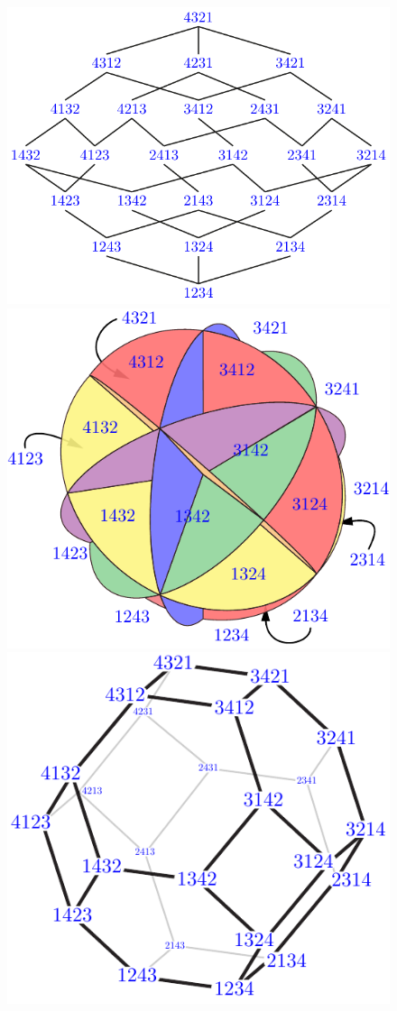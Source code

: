 \documentclass{amsart}
\theoremstyle{definition}
\begin{document}
\begin{figure}

	\centerline{\includegraphics[scale=.6]{weakOrderLeft4} \; \includegraphics[scale=.6]{braidFanLeft4} \; \includegraphics[scale=.6]{permutahedronLeft4}}

\end{figure}
\end{document}
